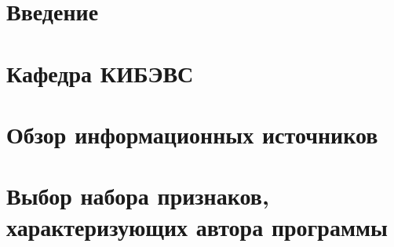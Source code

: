 


\newpage
{}
 
 
 
%  
 
 \newpage
 \tableofcontents

% 


\titleformat{\section}{\centering\normalfont\normalsize}{\thesection}{1.0em}{}
\titleformat{\subsection}{\centering\normalfont\normalsize}{\thesubsection}{1.0em}{}
\titleformat{\subsubsection}{\centering\normalfont\normalsize}{\thesubsection}{1.0em}{}


\newpage
{}
\setcounter{section}{0}
\section*{Введение}


\newpage
\section{Кафедра КИБЭВС}



\newpage 
\section{Обзор информационных источников }


% 
% 

\newpage 
\section{Выбор набора признаков, характеризующих автора программы}\label{features}
 
 
